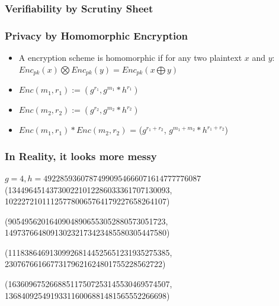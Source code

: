 \documentclass{beamer}
\begin{document}
\begin{frame}
\frametitle{Verifiability by Scrutiny Sheet}
\lstnineth
\end{frame}


\begin{frame}
\frametitle{Privacy by Homomorphic Encryption}
\begin{itemize}
\item A encryption scheme is homomorphic if for any two plaintext $x$ and $y$:
$Enc_{pk}(x) \bigotimes Enc_{pk}(y) = Enc_{pk} (x \bigoplus y)$
\item $Enc(m_{1}, r_{1}) := (g^{r_{1}}, g^{m_{1}} *  h^{r_{1}})$ 
\item $Enc(m_{2}, r_{2}) := (g^{r_{2}}, g^{m_{2}} *  h^{r_{2}})$
\item  $Enc(m_{1}, r_{1})  * Enc(m_{2}, r_{2}) $ =  ($g^{r_{1} + r_{2}}$, $g^{m_{1} + m_{2}} * h^{r_{1} + r_{2}}$) 		
		
\end{itemize}
\end{frame}

\begin{frame}
\frametitle{In Reality, it looks more messy}
$g = 4, h = 49228593607874990954666071614777776087$
 (134496451437300221012286033361707130093, 102227210111257780065764179227658264107)
 
 (90549562016409048906553052880573051723, 149737664809130232173423485580305447580)
  
 (111838646913099268144525651231935275385, 23076766166773179621624801755228562722) 
 
 (163609675266885117507253145530469574507, 136840925491933116006881481565552266698)
\end{frame}
\end{document}
